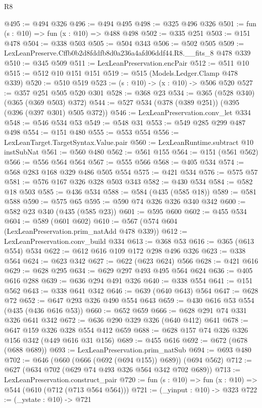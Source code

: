 \begin{lexlean}{R8}
\begin{coremodule}
@495 := @494 @326
@496 := @494 @495
@498 := @325 @496 @326
@501 := fun (s : @10) => fun (x : @10) => @488 @498
@502 := @335 @251
@503 := @151 @478
@504 := @338 @503
@505 := @504 @343
@506 := @502 @505
@509 := LexLeanPreserve.Cffb0b2d8fddfb8d0a236a4afd06ddf44.R8.__fits_8 @478 @339
@510 := @345 @509
@511 := LexLeanPreservation.encPair
@512 := @511 @10
@515 := @512 @10 @151 @151
@519 := @515 (Models.Ledger.Clamp @478 @339)
@520 := @510 @519
@523 := (s : @10) -> (x : @10) -> @506 @520
@527 := @357 @251 @505 @520 @301
@528 := @368 @23
@534 := @365 (@528 @340) (@365 (@369 @503) @372)
@544 := @527 @534 (@378 (@389 @251)) (@395 (@396 (@397 @301) @505 @372))
@546 := LexLeanPreservation.conv_let @334
@548 := @546 @534 @53
@549 := @548 @31
@553 := @549 @285 @299 @487 @498
@554 := @151 @480
@555 := @553 @554
@556 := LexLeanTarget.TargetSyntax.Value.pair
@560 := LexLeanRuntime.subtract @10 instSubNat
@561 := @560 @480
@562 := @561 @155
@564 := @151 (@561 @562)
@566 := @556 @564 @564
@567 := @555 @566
@568 := @405 @534
@574 := @568 @283 @168 @329 @486 @505 @554
@575 := @421 @534
@576 := @575 @57
@581 := @576 @167 @326 @328 @503 @343
@582 := @430 @534
@584 := @582 @18 @503
@585 := @436 @534
@588 := @584 (@435 (@585 @18))
@589 := @581 @588
@590 := @575 @65
@595 := @590 @74 @326 @326 @340 @342
@600 := @582 @23 @340 (@435 (@585 @23))
@601 := @595 @600
@602 := @455 @534
@604 := @589 (@601 @602)
@610 := @567 (@574 @604 (LexLeanPreservation.prim_natAdd @478 @339))
@612 := LexLeanPreservation.conv_build @334
@613 := @368 @53
@616 := @365 (@613 @554) @534
@622 := @612 @616 @109 @172 @298 @496 @326
@623 := @338 @564
@624 := @623 @342
@627 := @622 (@623 @624) @566
@628 := @421 @616
@629 := @628 @295
@634 := @629 @297 @493 @495 @564 @624
@636 := @405 @616 @288
@639 := @636 @294 @491 @326
@640 := @338 @554
@641 := @151 @562
@643 := @338 @641 @342
@646 := @639 (@640 @643) @564
@647 := @628 @72
@652 := @647 @293 @326 @490 @554 @643
@659 := @430 @616 @53 @554 (@435 (@436 @616 @53))
@660 := @652 @659
@666 := @628 @291 @74 @331 @326 @641 @342
@672 := @636 @290 @329 @326 (@640 @412) @641
@678 := @647 @159 @326 @328 @554 @412 @659
@688 := @628 @157 @74 @326 @326 @156 @342 (@449 @616 @31 @156)
@689 := @455 @616
@692 := @672 (@678 (@688 @689))
@693 := LexLeanPreservation.prim_natSub
@694 := @693 @480
@702 := @646 (@660 (@666 (@692 (@694 @155)) @689)) (@694 @562)
@712 := @627 (@634 @702 (@629 @74 @493 @326 @564 @342 @702 @689))
@713 := LexLeanPreservation.construct_pair
@720 := fun (s : @10) => fun (x : @10) => @544 (@610 (@712 (@713 @564 @564)))
@721 := (_yinput : @10) -> @323
@722 := (_ystate : @10) -> @721

\end{coremodule}
\end{lexlean}
